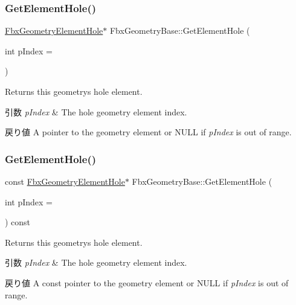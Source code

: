 \subsubsection{\texorpdfstring{Get\+Element\+Hole()}{GetElementHole()}\hspace{0.1cm}{\footnotesize\ttfamily [1/2]}}
{\footnotesize\ttfamily \hyperlink{fbxlayer_8h_ac66f768aa149c016447f88213c374e25}{Fbx\+Geometry\+Element\+Hole}$\ast$ Fbx\+Geometry\+Base\+::\+Get\+Element\+Hole (\begin{DoxyParamCaption}\item[{int}]{p\+Index = {} }\end{DoxyParamCaption})}

Returns this geometry\textquotesingle{}s hole element. 
\begin{DoxyParams}{引数}
{\em p\+Index} & The hole geometry element index. \\
\hline
\end{DoxyParams}
\begin{DoxyReturn}{戻り値}
A pointer to the geometry element or {\ttfamily N\+U\+LL} if {\itshape p\+Index} is out of range. 
\end{DoxyReturn}
\mbox{\label{class_fbx_geometry_base_a503d850eaaed9c21457cf19b86080f14}} 
\subsubsection{\texorpdfstring{Get\+Element\+Hole()}{GetElementHole()}\hspace{0.1cm}{\footnotesize\ttfamily [2/2]}}
{\footnotesize\ttfamily const \hyperlink{fbxlayer_8h_ac66f768aa149c016447f88213c374e25}{Fbx\+Geometry\+Element\+Hole}$\ast$ Fbx\+Geometry\+Base\+::\+Get\+Element\+Hole (\begin{DoxyParamCaption}\item[{int}]{p\+Index = {} }\end{DoxyParamCaption}) const}

Returns this geometry\textquotesingle{}s hole element. 
\begin{DoxyParams}{引数}
{\em p\+Index} & The hole geometry element index. \\
\hline
\end{DoxyParams}
\begin{DoxyReturn}{戻り値}
A const pointer to the geometry element or {\ttfamily N\+U\+LL} if {\itshape p\+Index} is out of range. 
\end{DoxyReturn}
\mbox{\label{class_fbx_geometry_base_a93f4c298785352d3a8e05596d31d0760}} 
